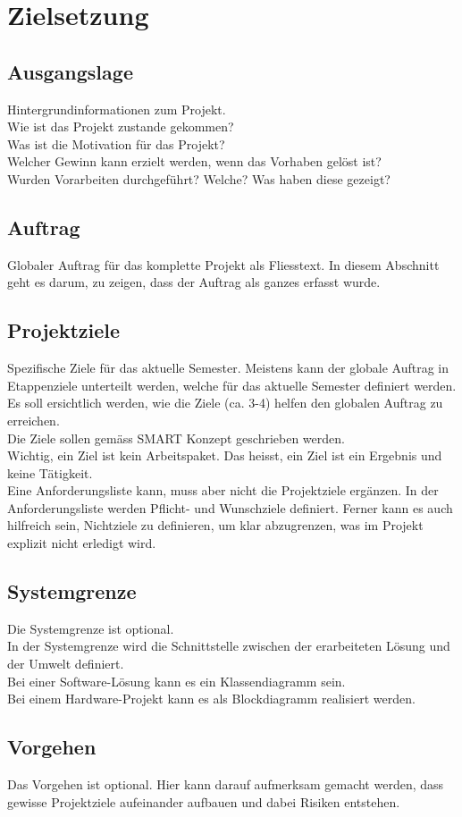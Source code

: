 \chapter{Zielsetzung}

\section{Ausgangslage}
Hintergrundinformationen zum Projekt.\\
Wie ist das Projekt zustande gekommen?\\
Was ist die Motivation für das Projekt?\\
Welcher Gewinn kann erzielt werden, wenn das Vorhaben gelöst ist?\\
Wurden Vorarbeiten durchgeführt? Welche? Was haben diese gezeigt?

\section{Auftrag}
Globaler Auftrag für das komplette Projekt als Fliesstext. In diesem Abschnitt geht es darum, zu zeigen, dass der Auftrag als ganzes erfasst wurde.

\section{Projektziele}
Spezifische Ziele für das aktuelle Semester. Meistens kann der globale Auftrag in Etappenziele unterteilt werden, welche für das aktuelle Semester definiert werden.\\

Es soll ersichtlich werden, wie die Ziele (ca. 3-4) helfen den globalen Auftrag zu erreichen.\\
Die Ziele sollen gemäss SMART Konzept geschrieben werden.\\
Wichtig, ein Ziel ist kein Arbeitspaket. Das heisst, ein Ziel ist ein Ergebnis und keine Tätigkeit.\\

Eine Anforderungsliste kann, muss aber nicht die Projektziele ergänzen. In der Anforderungsliste werden Pflicht- und Wunschziele definiert. Ferner kann es auch hilfreich sein, Nichtziele zu definieren, um klar abzugrenzen, was im Projekt explizit nicht erledigt wird.


\section{Systemgrenze}
Die Systemgrenze ist optional.\\
In der Systemgrenze wird die Schnittstelle zwischen der erarbeiteten Lösung und der Umwelt definiert.\\
Bei einer Software-Lösung kann es ein Klassendiagramm sein.\\
Bei einem Hardware-Projekt kann es als Blockdiagramm realisiert werden.


\section{Vorgehen}
Das Vorgehen ist optional. Hier kann darauf aufmerksam gemacht werden, dass gewisse Projektziele aufeinander aufbauen und dabei Risiken entstehen.






